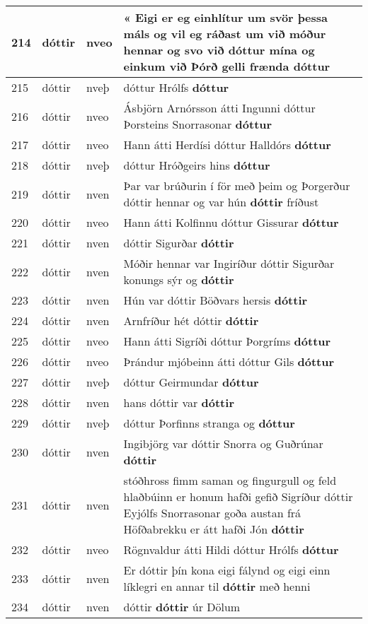\documentclass{article}
\begin{document}
\begin{longtable}{p{1cm}|p{1cm}|p{1cm}|p{13cm}}
\hline
214&dóttir&nveo&« Eigi er eg einhlítur um svör þessa máls og vil eg ráðast um við móður hennar og svo við dóttur mína og einkum við Þórð gelli frænda \textbf{dóttur} \\
\hline
215&dóttir&nveþ&dóttur Hrólfs \textbf{dóttur} \\
\hline
216&dóttir&nveo&Ásbjörn Arnórsson átti Ingunni dóttur Þorsteins Snorrasonar \textbf{dóttur} \\
\hline
217&dóttir&nveo&Hann átti Herdísi dóttur Halldórs \textbf{dóttur} \\
\hline
218&dóttir&nveþ&dóttur Hróðgeirs hins \textbf{dóttur} \\
\hline
219&dóttir&nven&Þar var brúðurin í för með þeim og Þorgerður dóttir hennar og var hún \textbf{dóttir} fríðust\\
\hline
220&dóttir&nveo&Hann átti Kolfinnu dóttur Gissurar \textbf{dóttur} \\
\hline
221&dóttir&nven&dóttir Sigurðar \textbf{dóttir} \\
\hline
222&dóttir&nven&Móðir hennar var Ingiríður dóttir Sigurðar konungs sýr og \textbf{dóttir} \\
\hline
223&dóttir&nven&Hún var dóttir Böðvars hersis \textbf{dóttir} \\
\hline
224&dóttir&nven&Arnfríður hét dóttir \textbf{dóttir} \\
\hline
225&dóttir&nveo&Hann átti Sigríði dóttur Þorgríms \textbf{dóttur} \\
\hline
226&dóttir&nveo&Þrándur mjóbeinn átti dóttur Gils \textbf{dóttur} \\
\hline
227&dóttir&nveþ&dóttur Geirmundar \textbf{dóttur} \\
\hline
228&dóttir&nven&hans dóttir var \textbf{dóttir} \\
\hline
229&dóttir&nveþ&dóttur Þorfinns stranga og \textbf{dóttur} \\
\hline
230&dóttir&nven&Ingibjörg var dóttir Snorra og Guðrúnar \textbf{dóttir} \\
\hline
231&dóttir&nven&stóðhross fimm saman og fingurgull og feld hlaðbúinn er honum hafði gefið Sigríður dóttir Eyjólfs Snorrasonar goða austan frá Höfðabrekku er átt hafði Jón \textbf{dóttir} \\
\hline
232&dóttir&nveo&Rögnvaldur átti Hildi dóttur Hrólfs \textbf{dóttur} \\
\hline
233&dóttir&nven&Er dóttir þín kona eigi fálynd og eigi einn líklegri en annar til \textbf{dóttir} með henni\\
\hline
234&dóttir&nven&dóttir \textbf{dóttir} úr Dölum\\

\end{longtable}
\end{document}
